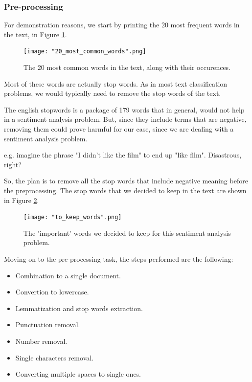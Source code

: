 \documentclass[10pt, a4paper]{article}
\begin{document}
        


    \subsubsection{Pre-processing}
    
     For demonstration reasons, we start by printing the 20 most frequent words in the text, in Figure \ref{fig::20_common}.

        \begin{figure}
	    \centering
            \texttt{[image: "20\_most\_common\_words".png]}
	    \caption{The 20 most common words in the text, along with their occurences.}
	    \label{fig::20_common}
	\end{figure}



     Most of these words are actually stop words. As in most text classification problems, we would typically need to remove the stop words of the text.
     
     The english stopwords is a package of 179 words that in general, would not help in a sentiment analysis problem. But, since they include terms that are negative, removing them could prove harmful for our case, since we are dealing with a sentiment analysis problem.

    e.g. imagine the phrase "I didn't like the film" to end up "like film". Disastrous, right?
   
    So, the plan is to remove all the stop words that include negative meaning before the preprocessing.
    The stop words that we decided to keep in the text are shown in Figure \ref{fig::to_keep}.

    \begin{figure}
	    \centering
            \texttt{[image: "to\_keep\_words".png]}
	    \caption{The 'important' words we decided to keep for this sentiment analysis problem.}
	    \label{fig::to_keep}
    \end{figure}

    Moving on to the pre-processing task, the steps performed are the following:
    \begin{itemize}
        \item{ Combination to a single document.}
        \item{ Convertion to lowercase.}
        \item{Lemmatization and stop words extraction.}
        \item{ Punctuation removal.}
        \item{ Number removal.}
         \item{Single characters removal.}
        \item{ Converting multiple spaces to single ones.}
    \end{itemize}
\end{document}
